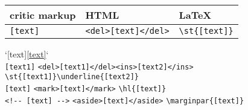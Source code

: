 \documentclass[]{article}
\begin{document}
\begin{longtable}[]{@{}lll@{}}
\toprule
critic markup & HTML & LaTeX\tabularnewline
\midrule
\endhead
\texttt{{[}text{]}} &
\texttt{\textless{}del\textgreater{}{[}text{]}\textless{}/del\textgreater{}}
& \texttt{\textbackslash{}st\{{[}text{]}\}}\tabularnewline
\bottomrule
\end{longtable}

`\texttt{\textbar{}}{[}text{]}\texttt{\textbar{}}\underline{[text]}`
\textbar{}\\
\texttt{{[}text1{]}} \textbar{}
\texttt{\textless{}del\textgreater{}{[}text1{]}\textless{}/del\textgreater{}\textless{}ins\textgreater{}{[}text2{]}\textless{}/ins\textgreater{}}
\textbar{}
\texttt{\textbackslash{}st\{{[}text1{]}\}\textbackslash{}underline\{{[}text2{]}\}}
\textbar{}\\
\texttt{{[}text{]}} \textbar{}
\texttt{\textless{}mark\textgreater{}{[}text{]}\textless{}/mark\textgreater{}}
\textbar{} \texttt{\textbackslash{}hl\{{[}text{]}\}} \textbar{}\\
\texttt{\textless{}!-\/-\ {[}text{]}\ -\/-\textgreater{}} \textbar{}
\texttt{\textless{}aside\textgreater{}{[}text{]}\textless{}/aside\textgreater{}}
\textbar{} \texttt{\textbackslash{}marginpar\{{[}text{]}\}} \textbar{}
\end{document}
